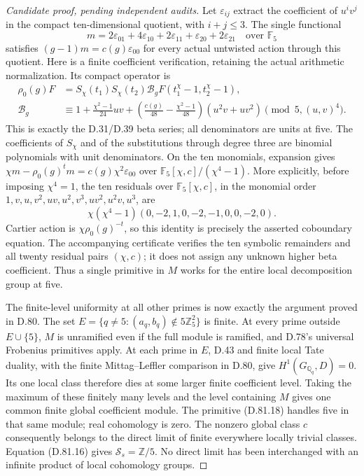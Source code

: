 \begin{proof}[Candidate proof, pending independent audits]
Let \(\varepsilon_{ij}\) extract the coefficient of \(u^iv^j\)
in the compact ten-dimensional quotient, with \(i+j\le3\).
The single functional
\[
 m=2\varepsilon_{01}+4\varepsilon_{10}
         +2\varepsilon_{11}+\varepsilon_{20}
         +2\varepsilon_{21}\quad\text{over }\mathbb F_5
                                                               \tag{D.81.18}
\]
satisfies \((g-1)m=c(g)\varepsilon_{00}\) for every actual
untwisted action through this quotient. Here is a finite
coefficient verification, retaining the actual arithmetic
normalization. Its compact operator is
\[
 \begin{split}
 \rho_0(g)F&=S_\chi(t_1)S_\chi(t_2)\mathcal B_g
                         F(t_1^\chi-1,t_2^\chi-1),\\
 \mathcal B_g&\equiv
  1+\frac{\chi^2-1}{24}uv
   +\left(\frac{c(g)}{48}-\frac{\chi^2-1}{48}\right)
                                  (u^2v+uv^2)
                 \pmod{5,(u,v)^4}.
 \end{split}                                                 \tag{D.81.19}
\]
This is exactly the D.31/D.39 beta series; all denominators
are units at five. The coefficients of \(S_\chi\) and of
the substitutions through degree three are binomial
polynomials with unit denominators. On the ten monomials,
expansion gives
\(\chi m-\rho_0(g)^t m=c(g)\chi^2\varepsilon_{00}\)
over \(\mathbb F_5[\chi,c]/(\chi^4-1)\).
More explicitly, before imposing \(\chi^4=1\), the ten
residuals over \(\mathbb F_5[\chi,c]\), in the monomial
order \(1,v,u,v^2,uv,u^2,v^3,uv^2,u^2v,u^3\), are
\[
 \chi(\chi^4-1)
             (0,-2,1,0,-2,-1,0,0,-2,0).
\]
Cartier action is \(\chi\rho_0(g)^{-t}\), so this identity
is precisely the asserted coboundary equation.
The accompanying certificate verifies the ten symbolic
remainders and all twenty residual pairs \((\chi,c)\);
it does not assign any unknown higher beta coefficient.
Thus a single primitive in \(M\) works for the entire
local decomposition group at five.

The finite-level uniformity at all other primes is now
exactly the argument proved in D.80. The set
\(E=\{q\ne5:(a_q,b_q)\notin5\mathbb Z_5^2\}\) is finite.
At every prime outside \(E\cup\{5\}\), \(M\) is unramified
even if the full module is ramified, and D.78's universal
Frobenius primitives apply. At each prime in \(E\),
D.43 and finite local Tate duality, with the finite
Mittag--Leffler comparison in D.80, give
\(H^1(G_{\mathbb Q_q},D)=0\). Its one local class therefore
dies at some larger finite coefficient level.
Taking the maximum of these finitely many levels and
the level containing \(M\) gives one common finite
global coefficient module. The primitive (D.81.18)
handles five in that same module; real cohomology is zero.
The nonzero global class \(c\) consequently belongs to
the direct limit of finite everywhere locally trivial
classes. Equation (D.81.16) gives
\(\mathcal S_s=\mathbb Z/5\).
No direct limit has been interchanged with an infinite
product of local cohomology groups.


\end{proof}
